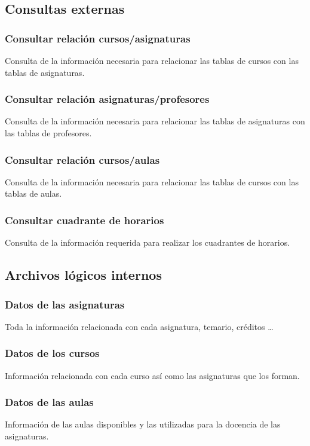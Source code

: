 \documentclass[11pt,a4paper,spanish,twoside]{book}
\begin{document}
\subsection{Consultas externas}
\subsubsection{Consultar relación cursos/asignaturas}
Consulta de la información necesaria para relacionar las tablas de
cursos con las tablas de asignaturas.

\subsubsection{Consultar relación asignaturas/profesores}
Consulta de la información necesaria para relacionar las tablas de
asignaturas con las tablas de profesores.

\subsubsection{Consultar relación cursos/aulas}
Consulta de la información necesaria para relacionar las tablas de
cursos con las tablas de aulas.

\subsubsection{Consultar cuadrante de horarios}
Consulta de la información requerida para realizar los cuadrantes de horarios.

\subsection{Archivos lógicos internos}
\subsubsection{Datos de las asignaturas}
Toda la información relacionada con cada asignatura, temario, créditos \dots

\subsubsection{Datos de los cursos}
Información relacionada con cada curso así como las asignaturas que los forman.

\subsubsection{Datos de las aulas}
Información de las aulas disponibles y las utilizadas para la docencia de las
asignaturas. 
\end{document}
